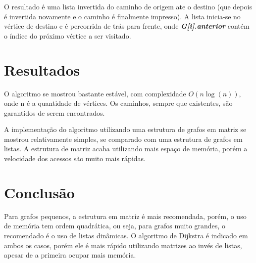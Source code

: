 \documentclass[10pt,a4paper]{article}
\begin{document}
O resultado é uma lista invertida do caminho de origem ate o destino (que depois é invertida novamente e o caminho é finalmente impresso). A lista inicia-se no vértice de destino e é percorrida de trás para frente, onde \textit{\textbf{G[i].anterior}} contém o índice do próximo vértice a ser visitado.

\section{Resultados}

O algoritmo se mostrou bastante estável, com complexidade $O(n\log(n))$, onde n é a quantidade de vértices. Os caminhos, sempre que existentes, são garantidos de serem encontrados.

A implementação do algoritmo utilizando uma estrutura de grafos em matriz se mostrou relativamente simples, se comparado com uma estrutura de grafos em listas. A estrutura de matriz acaba utilizando mais espaço de memória, porém a velocidade dos acessos são muito mais rápidas.

\section{Conclusão}

Para grafos pequenos, a estrutura em matriz é mais recomendada, porém, o uso de memória tem ordem quadrática, ou seja, para grafos muito grandes, o recomendado é o uso de listas dinâmicas. O algoritmo de Dijkstra é indicado em ambos os casos, porém ele é mais rápido utilizando matrizes ao invés de listas, apesar de a primeira ocupar mais memória.
\end{document}
